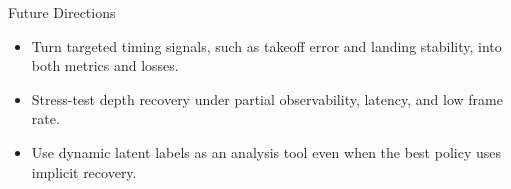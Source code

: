 \documentclass[aspectratio=169,xcolor=dvipsnames]{beamer}
\begin{document}
\begin{frame}{Future Directions}
    \begin{itemize}
        \setlength{\itemsep}{0.55em}
        \item Turn targeted timing signals, such as takeoff error and landing stability, into both metrics and losses.
        \item Stress-test depth recovery under partial observability, latency, and low frame rate.
        \item Use dynamic latent labels as an analysis tool even when the best policy uses implicit recovery.
    \end{itemize}
\end{frame}
\end{document}
